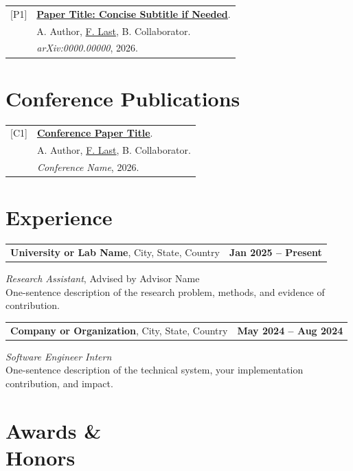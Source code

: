 \documentclass[margin,line]{res}
\begin{document}
\begin{resume}
\begin{tabularx}{\textwidth}{@{}l X@{}}
[P1] &
\href{https://example.com/preprint}{\textcolor{cvblue}{\textbf{Paper Title: Concise Subtitle if Needed}}}. \\
& A. Author, \underline{F. Last}, B. Collaborator. \\
& \emph{arXiv:0000.00000}, 2026. \\
\end{tabularx}

\section{\sc Conference Publications}

\begin{tabularx}{\textwidth}{@{}l X@{}}
[C1] &
\href{https://example.com/paper}{\textcolor{cvblue}{\textbf{Conference Paper Title}}}. \\
& A. Author, \underline{F. Last}, B. Collaborator. \\
& \emph{Conference Name}, 2026. \\
\end{tabularx}

\section{\sc Experience}

\begin{tabularx}{\textwidth}{@{}X r@{}}
\textbf{University or Lab Name}, City, State, Country & \textbf{Jan 2025 -- Present} \\
\end{tabularx}
\emph{Research Assistant}, Advised by Advisor Name \\
One-sentence description of the research problem, methods, and evidence of contribution.

\begin{tabularx}{\textwidth}{@{}X r@{}}
\textbf{Company or Organization}, City, State, Country & \textbf{May 2024 -- Aug 2024} \\
\end{tabularx}
\emph{Software Engineer Intern} \\
One-sentence description of the technical system, your implementation contribution, and impact.

\section{\sc Awards \&\\ Honors}


\end{resume}
\end{document}
